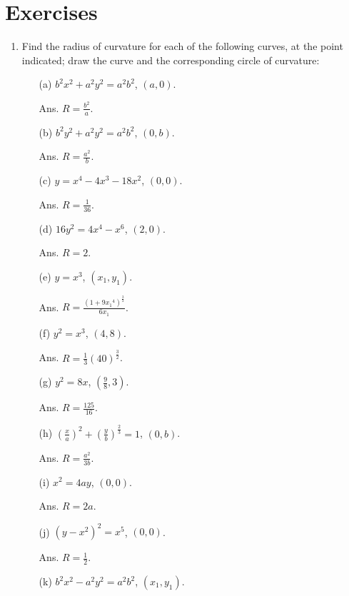 \section{Exercises}

\begin{enumerate}
\item
Find the radius of curvature for each of the following 
curves, at the point indicated; draw the curve and the 
corresponding circle of curvature:

\begin{itemize}
\item[(a)] 
$b^2x^2 + a^2y^2 = a^2b^2$, $(a,0)$. 	

Ans. 	$R = \frac{b^2}{a}$.

\item[(b)]
 $b^2y^2 + a^2y^2 = a^2b^2$, $(0,b)$.

Ans. $R = \frac{a^2}{b}$.

\item[(c)]
 $y = x^4 - 4x^3 - 18x^2$, $(0,0)$.

Ans. $R = \frac{1}{36}$.

\item[(d)]
 $16y^2 = 4x^4 - x^6$, $(2,0)$. 	  	

Ans. $R = 2$.

\item[(e)]
 $y = x^3$, $(x_1,y_1)$. 

Ans. $R = \frac{(1 + 9{x_1}^4)^{\frac{3}{2}}}{6x_1}$.

\item[(f)]
 $y^2 = x^3$, $(4,8)$.

Ans. $R = \frac{1}{3}(40)^{\frac{3}{2}}$.

\item[(g)]
 $y^2 = 8x$, $(\frac{9}{8}, 3)$. 

Ans. $R = \frac{125}{16}$.

\item[(h)]
 $\left( \frac{x}{a} \right)^2 
+ \left( \frac{y}{b} \right)^{\frac{2}{3}} = 1$, $(0, b)$. 	  	

Ans. $R = \frac{a^2}{3b}$.

\item[(i)]
 $x^2 = 4ay$, $(0,0)$. 

Ans. $R = 2a$.

\item[(j)]
 $(y - x^2)^2 = x^5$, $(0,0)$.

Ans. $R = \frac{1}{2}$.

\item[(k)]
 $b^2x^2 - a^2y^2 = a^2b^2$, $(x_1,y_1)$. 


\end{itemize}
\end{enumerate}
